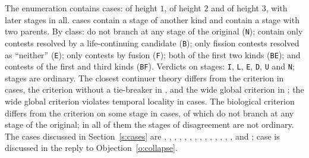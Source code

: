 \documentclass{situationist-preprint}
\begin{document}
The enumeration contains \stcases{} cases: \sthone{} of height $1$, \sthtwo{} of height $2$ and \sththree{} of height $3$, with \ststages{} later stages in all. \stmachine{} cases contain a stage of another kind and \stfusionstruct{} contain a stage with two parents. By class: \stclsN{} do not branch at any stage of the original (\texttt{N}); \stclsB{} contain only contests resolved by a life-continuing candidate (\texttt{B}); \stclsE{} only fission contests resolved as \enquote{neither} (\texttt{E}); \stclsF{} only contests by fusion (\texttt{F}); \stclsBE{} both of the first two kinds (\texttt{BE}); and \stclsBF{} contests of the first and third kinds (\texttt{BF}). Verdicts on stages: \stvI{} \texttt{I}, \stvL{} \texttt{L}, \stvE{} \texttt{E}, \stvD{} \texttt{D}, \stvU{} \texttt{U} and \stvN{} \texttt{N}; \stordstages{} stages are ordinary. The closest continuer theory differs from the criterion in \stdisC{} cases, the criterion without a tie-breaker in \stdisP{}, and the wide global criterion in \stdisW{}; the wide global criterion violates temporal locality in \stwidenonlocal{} cases. The biological criterion differs from the criterion on some stage in \stbiodis{} cases, of which \stbiodisN{} do not branch at any stage of the original; in all of them the stages of disagreement are not ordinary. The cases discussed in Section~\ref{s:cases} are \caseOrdinary, \caseSleepLong, \caseTeleport, \caseBranchLine, \caseBranchLineLate, \caseBranchLineThenTele, \caseBranchLineWeak, \caseFission, \caseFissionUneven, \caseFissionLater, \caseUploadD, \caseUploadN, \caseUploadDownload, \caseFusionLife, \caseFusionNone{} and \caseTeleBranch; case \caseDisrupted{} is discussed in the reply to Objection~\ref{o:collapse}.


\end{document}
